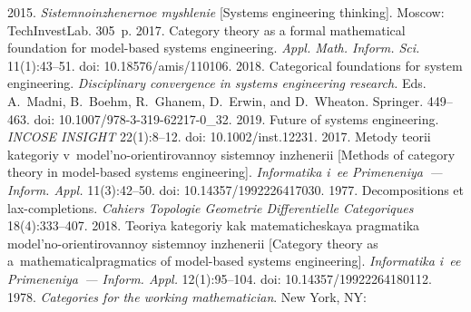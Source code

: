 
\vspace*{-6pt}



  \begin{multicols}{2}

\renewcommand{\bibname}{\protect\rmfamily References}

{\small\frenchspacing
 {\baselineskip=10.8pt
 \begin{thebibliography}{99}
 
 \vspace*{-3pt} 
    2015. \textit{Sistemnoinzhenernoe myshlenie} [Systems engineering 
thinking]. Moscow: TechInvestLab. 305~p.
    2017. Category theory as a formal mathematical 
foundation for model-based systems engineering. \textit{Appl. Math. Inform. Sci.} 11(1):43--51. 
doi: 10.18576/amis/110106.
    2018. Categorical foundations for system 
engineering.  \textit{Disciplinary convergence in systems engineering research.} Eds. A.~Madni, 
B.~Boehm, R.~Ghanem, D.~Erwin, and D.~Wheaton. Springer. 449--463. doi:  
10.1007/978-3-319-62217-0\_32.
    2019. Future of systems engineering. \textit{INCOSE INSIGHT}  
22(1):8--12. doi: 10.1002/inst.12231.
    2017. Metody teorii kategoriy v~model'no-orientirovannoy sistemnoy 
inzhenerii [Methods of category theory in model-based systems engineering]. \textit{Informatika 
i~ee Primeneniya~--- Inform. Appl.} 11(3):42--50. doi: 10.14357/1992226417030.
    1977. Decompositions et lax-completions. \textit{Cahiers 
Topologie Geometrie Differentielle Categoriques} 18(4):333--407.
    2018. Teoriya kategoriy kak ma\-te\-ma\-ti\-che\-skaya pragmatika  
model'no-orientirovannoy sistemnoy inzhenerii [Category theory as a~mathematical\linebreak pragmatics of 
model-based systems engineering]. \textit{Informatika i~ee Primeneniya~--- Inform. Appl.}  
12(1):95--104. doi: 10.14357/19922264180112.
    1978. \textit{Categories for the working mathematician}. New York, NY: 

\end{thebibliography}}}
\end{multicols}
